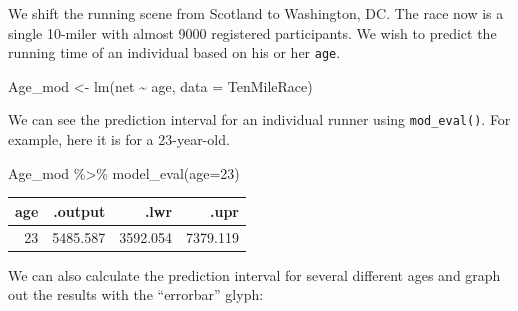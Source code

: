 \documentclass[
  letterpaper,
  DIV=11,
  numbers=noendperiod,
  oneside]{scrreprt}
\newenvironment{Shaded}{\begin{snugshade}}{\end{snugshade}}
\newcommand{\AttributeTok}[1]{\textcolor[rgb]{0.40,0.45,0.13}{#1}}
\newcommand{\DecValTok}[1]{\textcolor[rgb]{0.68,0.00,0.00}{#1}}
\newcommand{\FunctionTok}[1]{\textcolor[rgb]{0.28,0.35,0.67}{#1}}
\newcommand{\NormalTok}[1]{\textcolor[rgb]{0.00,0.23,0.31}{#1}}
\newcommand{\OtherTok}[1]{\textcolor[rgb]{0.00,0.23,0.31}{#1}}
\newcommand{\SpecialCharTok}[1]{\textcolor[rgb]{0.37,0.37,0.37}{#1}}
\begin{document}
\begin{tcolorbox}[enhanced jigsaw, colbacktitle=quarto-callout-note-color!10!white, breakable, opacitybacktitle=0.6, colback=white, left=2mm, arc=.35mm, colframe=quarto-callout-note-color-frame, coltitle=black, toprule=.15mm, opacityback=0, leftrule=.75mm, bottomtitle=1mm, toptitle=1mm, titlerule=0mm, title=\textcolor{quarto-callout-note-color}{\faInfo}\hspace{0.5em}{Example: Graphics for the prediction interval}, rightrule=.15mm, bottomrule=.15mm]

We shift the running scene from Scotland to Washington, DC. The race now
is a single 10-miler with almost 9000 registered participants. We wish
to predict the running time of an individual based on his or her
\texttt{age}.

\begin{Shaded}
\begin{Highlighting}[]
\NormalTok{Age\_mod }\OtherTok{\textless{}{-}} \FunctionTok{lm}\NormalTok{(net }\SpecialCharTok{\textasciitilde{}}\NormalTok{ age, }\AttributeTok{data =}\NormalTok{ TenMileRace)}
\end{Highlighting}
\end{Shaded}

We can see the prediction interval for an individual runner using
\texttt{mod\_eval()}. For example, here it is for a 23-year-old.

\begin{Shaded}
\begin{Highlighting}[]
\NormalTok{Age\_mod }\SpecialCharTok{\%\textgreater{}\%} \FunctionTok{model\_eval}\NormalTok{(}\AttributeTok{age=}\DecValTok{23}\NormalTok{)}
\end{Highlighting}
\end{Shaded}

\ttfamily 
\begin{tabular}{rrrr}
\toprule
age & .output & .lwr & .upr\\
\midrule
23 & 5485.587 & 3592.054 & 7379.119\\
\bottomrule
\end{tabular} \normalfont
\bigskip

We can also calculate the prediction interval for several different ages
and graph out the results with the ``errorbar'' glyph:


\end{tcolorbox}
\end{document}
